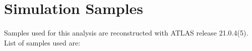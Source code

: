 \section{Simulation Samples}
\paragraph{}
Samples used for this analysis are reconstructed with ATLAS release 21.0.4(5). List of samples used are:
